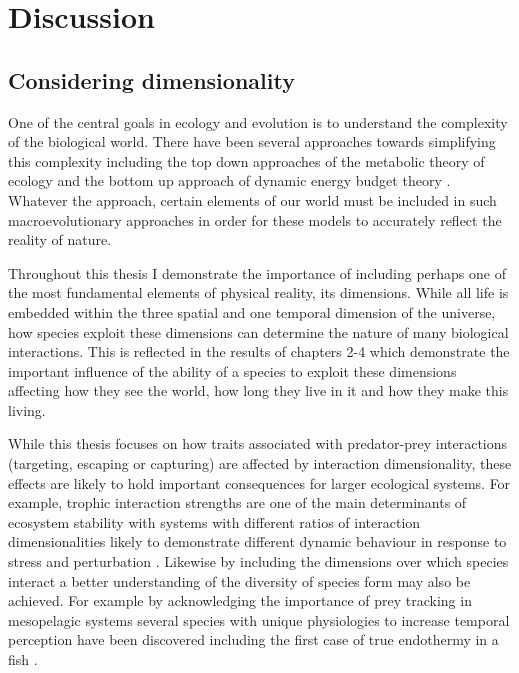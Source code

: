 \chapter{Discussion}
\label{chap:discussion}


\section{Considering dimensionality}

One of the central goals in ecology and evolution is to understand the complexity of the biological world. There have been several approaches towards simplifying this complexity including the top down approaches of the metabolic theory of ecology \citep{brown2004} and the bottom up approach of dynamic energy budget theory \citep{kooijman2009dynamic}. Whatever the approach, certain elements of our world must be included in such macroevolutionary approaches in order for these models to accurately reflect the reality of nature. 


Throughout this thesis I demonstrate the importance of including perhaps one of the most fundamental elements of physical reality, its dimensions. While all life is embedded within the three spatial and one temporal dimension of the universe, how species exploit these dimensions can determine the nature of many biological interactions. This is reflected in the results of chapters 2-4 which demonstrate the important influence of the ability of a species to exploit these dimensions affecting how they see the world, how long they live in it and how they make this living. 


While this thesis focuses on how traits associated with predator-prey interactions (targeting, escaping or capturing) are affected by interaction dimensionality, these effects are likely to hold important consequences for larger ecological systems. For example, trophic interaction strengths are one of the main determinants of ecosystem stability \citep{may1972will,pimm1984complexity} with systems with different ratios of interaction dimensionalities likely to demonstrate different dynamic behaviour in response to stress and perturbation \citep{donohue2013dimensionality}. Likewise by including the dimensions over which species interact a better understanding of the diversity of species form may also be achieved. For example by acknowledging the importance of prey tracking in mesopelagic systems several species with unique physiologies to increase temporal perception have been discovered \citep{fritsches2005warm,frank2012light,landgren2014visual} including the first case of true endothermy in a fish \citep{Wegner15052015}.


